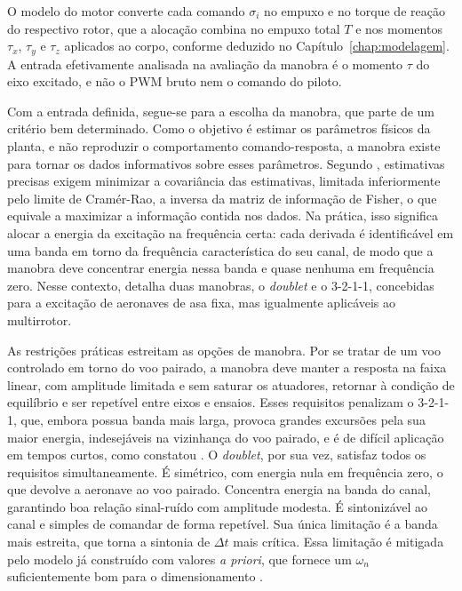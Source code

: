 {\color{blue}O modelo do motor converte cada comando $\sigma_i$ no empuxo e no torque de reação do respectivo rotor, que a alocação combina no empuxo total $T$ e nos momentos $\tau_x$, $\tau_y$ e $\tau_z$ aplicados ao corpo, conforme deduzido no Capítulo~\ref{chap:modelagem}.} A entrada efetivamente analisada na avaliação da manobra é o momento $\tau$ do eixo excitado, e não o PWM bruto nem o comando do piloto.

Com a entrada definida, segue-se para a escolha da manobra, que parte de um critério bem determinado. Como o objetivo é estimar os parâmetros físicos da planta, e não reproduzir o comportamento comando-resposta, a manobra existe para tornar os dados informativos sobre esses parâmetros. Segundo \textcite{Tischler2012}, estimativas precisas exigem minimizar a covariância das estimativas, limitada inferiormente pelo limite de Cramér-Rao, a inversa da matriz de informação de Fisher, o que equivale a maximizar a informação contida nos dados. Na prática, isso significa alocar a energia da excitação na frequência certa: cada derivada é identificável em uma banda em torno da frequência característica do seu canal, de modo que a manobra deve concentrar energia nessa banda e quase nenhuma em frequência zero. Nesse contexto, \textcite{Jategaonkar2015} detalha duas manobras, o \textit{doublet} e o 3-2-1-1, concebidas para a excitação de aeronaves de asa fixa, mas igualmente aplicáveis ao multirrotor.

As restrições práticas estreitam as opções de manobra. Por se tratar de um voo controlado em torno do voo pairado, a manobra deve manter a resposta na faixa linear, com amplitude limitada e sem saturar os atuadores, retornar à condição de equilíbrio e ser repetível entre eixos e ensaios. Esses requisitos penalizam o 3-2-1-1, que, embora possua banda mais larga, provoca grandes excursões pela sua maior energia, indesejáveis na vizinhança do voo pairado, e é de difícil aplicação em tempos curtos, como constatou \textcite{Sato2021}. O \textit{doublet}, por sua vez, satisfaz todos os requisitos simultaneamente. É simétrico, com energia nula em frequência zero, o que devolve a aeronave ao voo pairado. Concentra energia na banda do canal, garantindo boa relação sinal-ruído com amplitude modesta. É sintonizável ao canal e simples de comandar de forma repetível. Sua única limitação é a banda mais estreita, que torna a sintonia de $\Delta t$ mais crítica. Essa limitação é mitigada pelo modelo já construído com valores \textit{a priori}, que fornece um $\omega_n$ suficientemente bom para o dimensionamento \cite{Jategaonkar2015, Tischler2012}.

